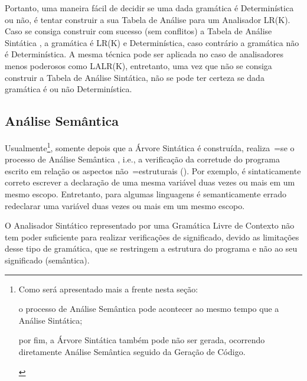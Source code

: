 Portanto,
uma maneira fácil de decidir se uma dada gramática é Determinística ou
não,
é tentar construir a sua Tabela de Análise para um Analisador LR(K).
Caso se consiga construir com sucesso (sem conflitos) a Tabela de Análise Sintática \cite{ahoCompilerDragonBook},
a gramática é LR(K) e
Determinística,
caso contrário a gramática não é Determinística.
A mesma técnica pode ser aplicada no caso de analisadores menos poderosos como LALR(K),
entretanto,
uma vez que não se consiga construir a Tabela de Análise Sintática,
não se pode ter certeza se dada gramática é ou
não Determinística.


\subsection{Análise Semântica}
\label{section:analiseSemantica}

Usualmente\footnote{
Como será apresentado mais a frente nesta seção:
\begin{inparaenum}[1)]
\item o processo de Análise Semântica pode acontecer ao mesmo tempo que a Análise Sintática;
\item por fim,
a Árvore Sintática também pode não ser gerada,
ocorrendo diretamente Análise Semântica seguido da Geração de Código.
\end{inparaenum}%
},
somente depois que a Árvore Sintática é construída,
realiza~=se o processo de Análise Semântica \cite{ahoCompilerDragonBook},
i.e.,
a verificação da corretude do programa escrito em relação os aspectos não~=estruturais ().
Por exemplo,
é sintaticamente correto escrever a declaração de uma mesma variável duas vezes ou
mais em um mesmo escopo.
Entretanto,
para algumas linguagens é semanticamente errado redeclarar uma variável duas vezes ou
mais em um mesmo escopo.

O Analisador Sintático representado por uma Gramática Livre de Contexto não tem poder suficiente para realizar verificações de significado,
devido as limitações desse tipo de gramática,
que se restringem a estrutura do programa e
não ao seu significado (semântica).

